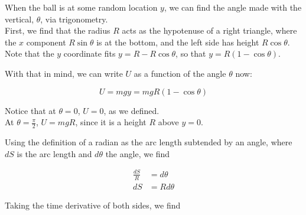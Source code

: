 \begin{figure}[H]
  \centering
{}
\caption{}
\end{figure}


When the ball is at some random location $y$, we can find the angle made with the vertical, $\theta$, via trigonometry.\\
First, we find that the radius $R$ acts as the hypotenuse of a right triangle, where the $x$ component $R \sin \theta$ is at the bottom, and the left side has height $R \cos \theta$. Note that the $y$ coordinate fits $y = R - R\cos \theta$, so that $y = R (1 - \cos \theta)$.

With that in mind, we can write $U$ as a function of the angle $\theta$ now:

\begin{equation}
U = m g y = m g R (1 - \cos \theta)
\end{equation}

Notice that at $\theta = 0$, $U = 0$, as we defined.\\
At $\displaystyle \theta = \frac{\pi}{2}$, $U = m g R$, since it is a height $R$ above $y = 0$.

Using the definition of a radian as the arc length subtended by an angle, where $dS$ is the arc length and $d\theta$ the angle, we find

\begin{align}
\frac{dS}{R} &= d\theta\\
dS &= R d\theta
\end{align}

Taking the time derivative of both sides, we find

